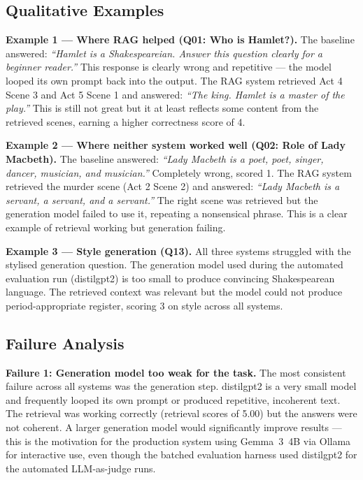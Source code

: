 \documentclass[10pt,conference]{IEEEtran}
\begin{document}
\subsection{Qualitative Examples}

\textbf{Example 1 --- Where RAG helped (Q01: Who is Hamlet?).}
The baseline answered: \textit{``Hamlet is a Shakespeareian. Answer
this question clearly for a beginner reader.''} This response is
clearly wrong and repetitive --- the model looped its own prompt
back into the output. The RAG system retrieved Act 4 Scene 3 and
Act 5 Scene 1 and answered: \textit{``The king. Hamlet is a master
of the play.''} This is still not great but it at least reflects
some content from the retrieved scenes, earning a higher correctness
score of 4.

\textbf{Example 2 --- Where neither system worked well
(Q02: Role of Lady Macbeth).}
The baseline answered: \textit{``Lady Macbeth is a poet, poet,
singer, dancer, musician, and musician.''} Completely wrong, scored
1. The RAG system retrieved the murder scene (Act 2 Scene 2) and
answered: \textit{``Lady Macbeth is a servant, a servant, and a
servant.''} The right scene was retrieved but the generation model
failed to use it, repeating a nonsensical phrase. This is a clear
example of retrieval working but generation failing.

\textbf{Example 3 --- Style generation (Q13).}
All three systems struggled with the stylised generation question.
The generation model used during the automated evaluation run
(distilgpt2) is too small to produce convincing Shakespearean
language. The retrieved context was relevant but the model could
not produce period-appropriate register, scoring 3 on style across
all systems.

\subsection{Failure Analysis}

\textbf{Failure 1: Generation model too weak for the task.}
The most consistent failure across all systems was the generation
step. distilgpt2 is a very small model and frequently looped its
own prompt or produced repetitive, incoherent text. The retrieval
was working correctly (retrieval scores of 5.00) but the answers
were not coherent. A larger generation model would significantly
improve results --- this is the motivation for the production
system using Gemma~3~4B via Ollama for interactive use, even though
the batched evaluation harness used distilgpt2 for the automated
LLM-as-judge runs.
\end{document}
